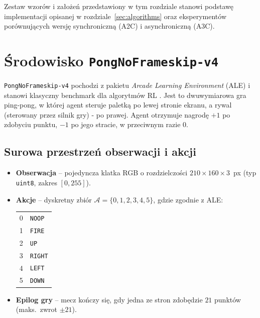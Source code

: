 \documentclass[12pt,a4paper]{article}
\begin{document}
\bigskip
Zestaw wzorów i założeń przedstawiony w tym rozdziale stanowi podstawę
implementacji opisanej w rozdziale~\ref{sec:algorithms}
oraz eksperymentów porównujących wersję synchroniczną (A2C)
i asynchroniczną (A3C).


\section{Środowisko \texttt{PongNoFrameskip-v4}}
\label{sec:pong}

\texttt{PongNoFrameskip-v4} pochodzi z pakietu \emph{Arcade Learning
Environment} (ALE) i stanowi klasyczny benchmark dla algorytmów RL  
\cite{Mnih2016A3C,Lapan2018}.  
Jest to dwuwymiarowa gra ping-pong, w której agent steruje paletką
po lewej stronie ekranu, a rywal (sterowany przez silnik gry) -
po prawej.  
Agent otrzymuje nagrodę $+1$ po zdobyciu punktu, $-1$ po jego stracie,
w przeciwnym razie $0$.

\subsection{Surowa przestrzeń obserwacji i akcji}

\begin{itemize}
  \item \textbf{Obserwacja} – pojedyncza klatka RGB
        o rozdzielczości \(210\times160\times3\)~px  
        (typ \texttt{uint8}, zakres \([0,255]\)).
  \item \textbf{Akcje} – dyskretny zbiór  
        \(\mathcal{A}=\{0,1,2,3,4,5\}\), gdzie zgodnie z ALE:
        \begin{center}
          \begin{tabular}{cl}
            0 & \texttt{NOOP} \\ 1 & \texttt{FIRE} \\
            2 & \texttt{UP}   \\ 3 & \texttt{RIGHT} \\
            4 & \texttt{LEFT} \\ 5 & \texttt{DOWN}
          \end{tabular}
        \end{center}
  \item \textbf{Epilog gry} – mecz kończy się, gdy jedna ze stron
        zdobędzie \(21\) punktów (maks.\ zwrot $\pm21$).
\end{itemize}
\end{document}
